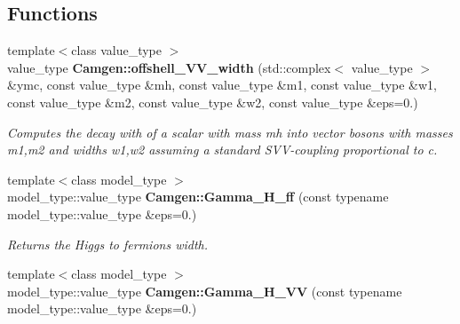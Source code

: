 \subsection*{Functions}
\begin{DoxyCompactItemize}
\item 
{\footnotesize template$<$class value\-\_\-type $>$ }\\value\-\_\-type {\bfseries Camgen\-::offshell\-\_\-\-V\-V\-\_\-width} (std\-::complex$<$ value\-\_\-type $>$ \&ymc, const value\-\_\-type \&mh, const value\-\_\-type \&m1, const value\-\_\-type \&w1, const value\-\_\-type \&m2, const value\-\_\-type \&w2, const value\-\_\-type \&eps=0.)
\begin{DoxyCompactList}\small\item\em Computes the decay with of a scalar with mass mh into vector bosons with masses m1,m2 and widths w1,w2 assuming a standard S\-V\-V-\/coupling proportional to c. \end{DoxyCompactList}\item 
\hypertarget{a00849_a3a0f56f55a981e974a89187a026f0083}{{\footnotesize template$<$class model\-\_\-type $>$ }\\model\-\_\-type\-::value\-\_\-type {\bfseries Camgen\-::\-Gamma\-\_\-\-H\-\_\-ff} (const typename model\-\_\-type\-::value\-\_\-type \&eps=0.)}\label{a00849_a3a0f56f55a981e974a89187a026f0083}

\begin{DoxyCompactList}\small\item\em Returns the Higgs to fermions width. \end{DoxyCompactList}\item 
\hypertarget{a00849_ab09b39e241f436ff21bcbae1cb37dfac}{{\footnotesize template$<$class model\-\_\-type $>$ }\\model\-\_\-type\-::value\-\_\-type {\bfseries Camgen\-::\-Gamma\-\_\-\-H\-\_\-\-V\-V} (const typename model\-\_\-type\-::value\-\_\-type \&eps=0.)}\label{a00849_ab09b39e241f436ff21bcbae1cb37dfac}


\end{DoxyCompactItemize}
